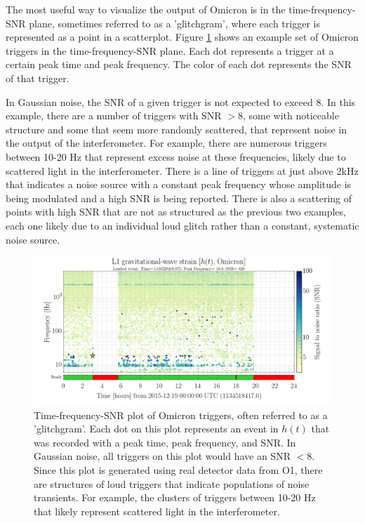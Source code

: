 The most useful way to visualize the output of Omicron is in the 
time-frequency-SNR plane, sometimes referred to as a 'glitchgram', 
where each trigger is represented as a point 
in a scatterplot. Figure \ref{fig:glitchgram} shows an example set of 
Omicron triggers in the time-frequency-SNR plane. Each dot represents 
a trigger at a certain peak time and peak frequency. The color of each 
dot represents the SNR of that trigger. 

In Gaussian noise, the SNR of a 
given trigger is not expected to exceed 8. In this example, there are a number 
of triggers with SNR $> 8$, some with noticeable structure and some that seem 
more randomly scattered, that represent noise in the output of the interferometer. 
For example, there are numerous triggers between 10-20 Hz that represent excess noise at 
these frequencies, likely due to scattered light in the 
interferometer. There is a line of triggers at just above 2kHz that indicates 
a noise source with a constant peak frequency whose amplitude is being modulated 
and a high SNR is being reported. There is also a scattering of points with high 
SNR that are not as structured as the previous two examples, each one likely due 
to an individual loud glitch rather than a constant, systematic noise source.

\begin{figure}[ht!]
\includegraphics[width=\textwidth]{figures/detchar/Omicron-Dec19}
\caption[Omicron time-frequency-SNR plot]{Time-frequency-SNR plot of Omicron triggers, %
         often referred to as a 'glitchgram'. Each dot on this plot represents an %
         event in $h(t)$ that was recorded with a peak time, peak frequency, and SNR. %
         In Gaussian noise, all triggers on %
         this plot would have an SNR $< 8$. Since this plot is generated using real %
         detector data from O1, there are structures of loud triggers that indicate %
         populations of noise transients. For example, the clusters of triggers %
         between 10-20 Hz that likely represent scattered light in the interferometer. %
         }
\label{fig:glitchgram}
\end{figure}

